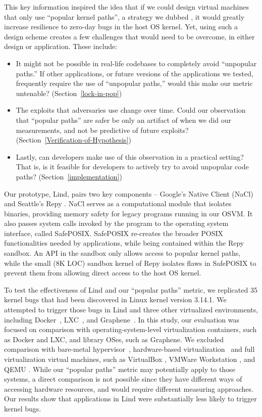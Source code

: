 This key information inspired the idea that if we could design virtual machines that only use ``popular kernel paths'', a strategy we dubbed \lip, 
it would greatly increase resilience to zero-day bugs in the host OS kernel. 
Yet, using such a design scheme creates a few challenges that would need to be overcome, in either design or application. These include: 

\begin{itemize}
\item It might not be possible in real-life codebases to completely avoid ``unpopular paths.''  
If other applications, or future versions of the applications we tested, frequently require the use of ``unpopular paths,'' would this make our metric untenable? 
(Section~{\ref{lock-in-pop}})
\item The exploits that adversaries use change over time. Could our observation that ``popular paths'' are safer be only an artifact of when we did our measurements, 
and not be predictive of future exploits? (Section~{\ref{Verification-of-Hypothesis}}) 
\item Lastly, can developers make use of this observation in a practical setting? That is, is it feasible for developers to actively try to avoid unpopular code paths? 
(Section~{\ref{implementation}})
\end{itemize}

Our prototype, Lind, pairs two key components -- Google's Native Client
(NaCl) \cite{NaCl-09} and Seattle's Repy \cite{Repy-10}.
NaCl serves as a computational module that isolates
binaries, providing memory safety for legacy programs running in our OSVM.
It also passes system calls invoked by the program to the operating system interface, called SafePOSIX.
SafePOSIX re-creates the broader POSIX functionalities needed by applications, while being contained within the Repy sandbox. 
An API in the sandbox only allows access to popular kernel paths, while
the small (8K LOC) sandbox kernel of Repy isolates flaws in SafePOSIX
to prevent them from allowing direct access to the host OS kernel.

To test the effectiveness of Lind and our ``popular paths'' metric, 
we replicated 35 kernel bugs that had been
discovered in Linux kernel version 3.14.1.  We attempted to trigger those
bugs in Lind and three other virtualized environments,
including Docker~\cite{Docker}, LXC~\cite{LXC}, and Graphene~\cite{Graphene-14}. 
In this study, our evaluation was focused on comparison with operating-system-level virtualization containers, such as Docker and LXC, 
and library OSes, such as Graphene. 
We excluded comparison with bare-metal hypervisor~\cite{Xen-03, VMWare-Server}, 
hardware-based virtualization~\cite{IntelVT, keller2010nohype} and full virtualization 
virtual machines, such as VirtualBox \cite{VirtualBox}, VMWare Workstation \cite{VMWare-Workstation}, and QEMU \cite{QEMU}. 
While our ``popular paths'' metric may potentially apply to those
systems, a direct comparison is not possible since they have different 
ways of accessing hardware resources, and would require different measuring approaches.
Our results show that applications in Lind were substantially less likely to trigger
kernel bugs.

